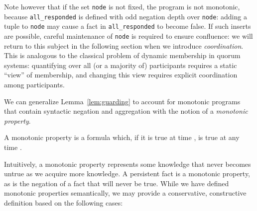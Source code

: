 Note however that if the set \texttt{node} is not fixed, the program is not monotonic, because 
\texttt{all\_responded} is defined with odd negation depth over \texttt{node}: adding a tuple
to \texttt{node} may cause a fact in \texttt{all\_responded} to become false.  If such inserts
are possible, careful maintenance of \texttt{node} is required to ensure confluence: we will
return to this subject in the following section when we introduce {\em coordination}.
This is analogous to the classical problem of dynamic membership in quorum systems: quantifying over all (or a majority
of) participants requires a static ``view'' of membership, and changing this view requires
explicit coordination among participants.



We can generalize Lemma~\ref{lem:guarding} to account for monotonic programs that 
contain syntactic negation  and aggregation with
the notion of a {\em monotonic property}.




\begin{definition}
\label{def:mp}
A monotonic property is a formula which, if it is true at time ,  is true at any time .
\end{definition}

Intuitively, a monotonic property represents some knowledge that never becomes untrue as we acquire  more knowledge.  A persistent fact is a monotonic property, as is the negation of a
fact that will never be true.  
While we have defined monotonic properties semantically, we may provide a conservative, 
constructive definition based on the following cases:


